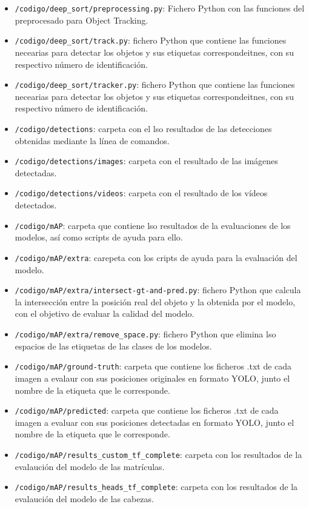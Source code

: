 \begin{itemize}
    \item \texttt{/codigo/deep\_sort/preprocessing.py}: Fichero Python con las funciones del preprocesado para Object Tracking.
    \item \texttt{/codigo/deep\_sort/track.py}: fichero Python que contiene las funciones necearias para detectar los objetos y sus etiquetas correspondeitnes, con su respectivo número de identificación.
    \item \texttt{/codigo/deep\_sort/tracker.py}: fichero Python que contiene las funciones necearias para detectar los objetos y sus etiquetas correspondeitnes, con su respectivo número de identificación.
    \item \texttt{/codigo/detections}: carpeta con el lso resultados de las detecciones obtenidas mediante la línea de comandos.
    \item \texttt{/codigo/detections/images}: carpeta con el resultado de las imágenes detectadas.
    \item \texttt{/codigo/detections/videos}: carpeta con el resultado de los vídeos detectados.
    \item \texttt{/codigo/mAP}: carpeta que contiene lso resultados de la evaluaciones de los modelos, así como scripts de ayuda para ello.
    \item \texttt{/codigo/mAP/extra}: carepeta con los cripts de ayuda para la evaluación del modelo.
    \item \texttt{/codigo/mAP/extra/intersect-gt-and-pred.py}: fichero Python que calcula la intersección entre la posición real del objeto y la obtenida por el modelo, con el objetivo de evaluar la calidad del modelo.
    \item \texttt{/codigo/mAP/extra/remove\_space.py}: fichero Python que elimina lso espacios de las etiquetas de las clases de los modelos.
    \item \texttt{/codigo/mAP/ground-truth}: carpeta que contiene los ficheros .txt de cada imagen a evalaur con sus posiciones originales en formato YOLO, junto el nombre de la etiqueta que le corresponde.
    \item \texttt{/codigo/mAP/predicted}: carpeta que contiene los ficheros .txt de cada imagen a evaluar con sus posiciones detectadas en formato YOLO, junto el nombre de la etiqueta que le corresponde.
    \item \texttt{/codigo/mAP/results\_custom\_tf\_complete}: carpeta con los resultados de la evalaución del modelo de las matrículas.
    \item \texttt{/codigo/mAP/results\_heads\_tf\_complete}: carpeta con los resultados de la evalaución del modelo de las cabezas.

\end{itemize}
